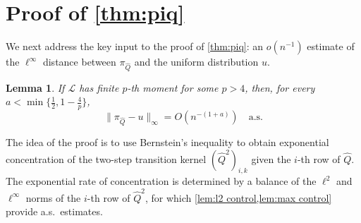 \documentclass[12pt]{amsart}
\newcommand\wh[1]{\widehat{#1}}
\newtheorem{lemma}[theorem]{Lemma}
\DeclareMathOperator{\1}{\mathbf{1}}
\begin{document}

\section{Proof of \texorpdfstring{\cref{thm:piq}}{Theorem 1.2}}\label{sec: proof of thm1}

We next address the key input to the proof of \cref{thm:piq}: an $o(n^{-1})$ estimate of the $\ell^\infty$ distance between $\pi_{\wh{Q}}$ and the uniform distribution $u$.

\begin{lemma}\label{lemma:P l_infty}
If $\mathcal{L}$ has finite $p$-th moment for some $p > 4$, then, for every $a < \min\{\frac12,1-\frac{4}{p}\}$,
\begin{equation}\label{eq:P l_infty}
	\| \pi_{\wh{Q}} - u \|_\infty = O(n^{-(1+a)}) \quad \mathrm{a.s.}
\end{equation}
\end{lemma}

The idea of the proof is to use Bernstein's inequality to obtain exponential concentration of the two-step transition kernel $(\wh{Q}^2)_{i,k}$ given the $i$-th row of $\wh{Q}$. The exponential rate of concentration is determined by a balance of the $\ell^2$ and $\ell^\infty$ norms of the $i$-th row of $\wh{Q}^2$, for which \cref{lem:l2 control,lem:max control} provide a.s.\ estimates.
\end{document}
